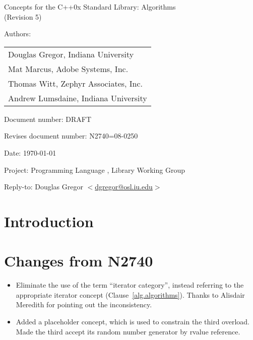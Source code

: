 \documentclass[american,twoside]{book}
\begin{document}
\raggedbottom

\begin{titlepage}
\begin{center}
\huge
Concepts for the C++0x Standard Library: Algorithms \\
(Revision 5)
\normalsize
\end{center}

\vspace{0.5in}
\par\noindent Authors: 
\begin{tabular}[t]{l}
Douglas Gregor, Indiana University \\
Mat Marcus, Adobe Systems, Inc.\\
Thomas Witt, Zephyr Associates, Inc.\\
Andrew Lumsdaine, Indiana University
\end{tabular}\vspace{-6pt}
\par\noindent Document number: DRAFT\vspace{-6pt}
\par\noindent Revises document number: N2740=08-0250\vspace{-6pt}
\par\noindent Date: \today\vspace{-6pt}
\par\noindent Project: Programming Language \Cpp{}, Library Working Group\vspace{-6pt}
\par\noindent Reply-to: Douglas Gregor $<$\href{mailto:dgregor@osl.iu.edu}{dgregor@osl.iu.edu}$>$\vspace{-6pt}

\section*{Introduction}
\section*{Changes from N2740}
\begin{itemize}
\item Eliminate the use of the term ``iterator category'', instead
  referring to the appropriate iterator concept
  (Clause~\ref{alg.algorithms}). Thanks to Alisdair Meredith for
  pointing out the inconsistency.
\item Added a placeholder 
  concept, which is used to constrain the third 
  overload. Made the third  accept its random
  number generator by rvalue reference.
\end{itemize}

\end{titlepage}
\end{document}

